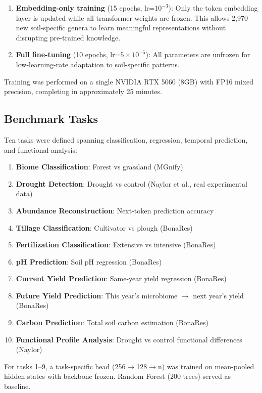\documentclass[11pt,a4paper]{article}
\begin{document}
\begin{enumerate}
\item \textbf{Embedding-only training} (15 epochs, lr=$10^{-3}$): Only the token embedding layer is updated while all transformer weights are frozen. This allows 2,970 new soil-specific genera to learn meaningful representations without disrupting pre-trained knowledge.
\item \textbf{Full fine-tuning} (10 epochs, lr=$5 \times 10^{-5}$): All parameters are unfrozen for low-learning-rate adaptation to soil-specific patterns.
\end{enumerate}

Training was performed on a single NVIDIA RTX 5060 (8GB) with FP16 mixed precision, completing in approximately 25 minutes.

\subsection{Benchmark Tasks}

Ten tasks were defined spanning classification, regression, temporal prediction, and functional analysis:

\begin{enumerate}
\item \textbf{Biome Classification}: Forest vs grassland (MGnify)
\item \textbf{Drought Detection}: Drought vs control (Naylor et al., real experimental data)
\item \textbf{Abundance Reconstruction}: Next-token prediction accuracy
\item \textbf{Tillage Classification}: Cultivator vs plough (BonaRes)
\item \textbf{Fertilization Classification}: Extensive vs intensive (BonaRes)
\item \textbf{pH Prediction}: Soil pH regression (BonaRes)
\item \textbf{Current Yield Prediction}: Same-year yield regression (BonaRes)
\item \textbf{Future Yield Prediction}: This year's microbiome $\rightarrow$ next year's yield (BonaRes)
\item \textbf{Carbon Prediction}: Total soil carbon estimation (BonaRes)
\item \textbf{Functional Profile Analysis}: Drought vs control functional differences (Naylor)
\end{enumerate}

For tasks 1--9, a task-specific head (256$\rightarrow$128$\rightarrow$n) was trained on mean-pooled hidden states with backbone frozen. Random Forest (200 trees) served as baseline.
\end{document}
